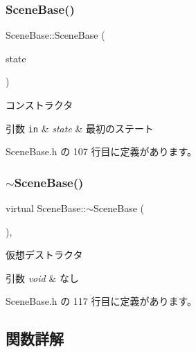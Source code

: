 \subsubsection{\texorpdfstring{Scene\+Base()}{SceneBase()}}
{\footnotesize\ttfamily Scene\+Base\+::\+Scene\+Base (\begin{DoxyParamCaption}\item[{\mbox{\hyperlink{class_scene_base_1_1_state_base}{State\+Base}} $\ast$}]{state }\end{DoxyParamCaption})\hspace{0.3cm}{\ttfamily [inline]}}



コンストラクタ 


\begin{DoxyParams}[1]{引数}
\mbox{\tt in}  & {\em state} & 最初のステート \\
\hline
\end{DoxyParams}


 Scene\+Base.\+h の 107 行目に定義があります。

\mbox{\label{class_scene_base_a187dd160e5a16909bcc6529851e38318}} 
\subsubsection{\texorpdfstring{$\sim$\+Scene\+Base()}{~SceneBase()}}
{\footnotesize\ttfamily virtual Scene\+Base\+::$\sim$\+Scene\+Base (\begin{DoxyParamCaption}{ }\end{DoxyParamCaption})\hspace{0.3cm}{\ttfamily [inline]}, {\ttfamily [virtual]}}



仮想デストラクタ 


\begin{DoxyParams}{引数}
{\em void} & なし \\
\hline
\end{DoxyParams}


 Scene\+Base.\+h の 117 行目に定義があります。



\subsection{関数詳解}
\mbox{\label{class_scene_base_aa5086973ccaf3d07e4ee9d1fc940e209}} 

